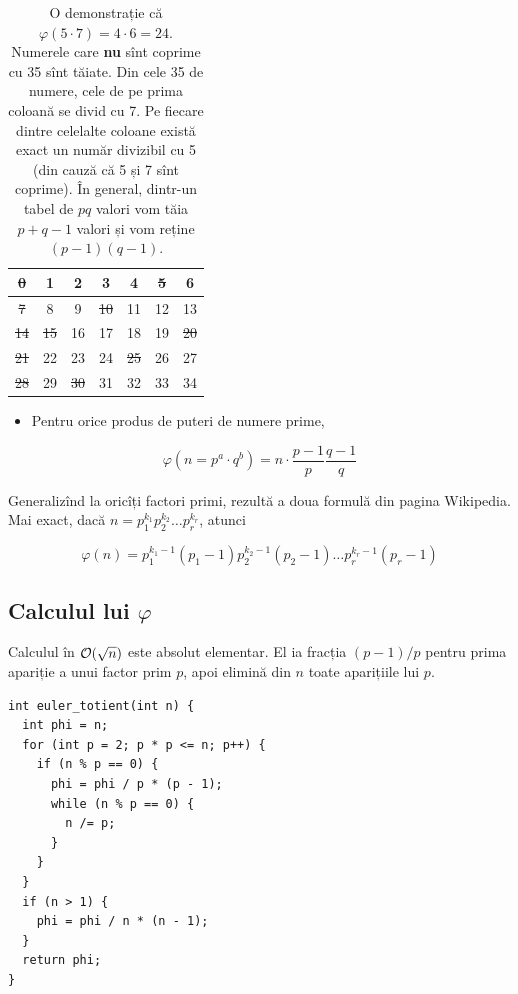 \documentclass[../main.tex]{subfiles}
\begin{document}
\begin{table}[!htbp]
  \centering
  \begin{tabular}{|c|c|c|c|c|c|c|}
    \hline
    \sout{0} & 1 & 2 & 3 & 4 & \sout{5} & 6 \\
    \hline
    \sout{7} & 8 & 9 & \sout{10} & 11 & 12 & 13 \\
    \hline
    \sout{14} & \sout{15} & 16 & 17 & 18 & 19 & \sout{20} \\
    \hline
    \sout{21} & 22 & 23 & 24 & \sout{25} & 26 & 27 \\
    \hline
    \sout{28} & 29 & \sout{30} & 31 & 32 & 33 & 34 \\
    \hline
  \end{tabular}

  \caption{O demonstrație că $\varphi(5 \cdot 7) = 4 \cdot 6 = 24$. Numerele care \textbf{nu} sînt coprime cu 35 sînt tăiate. Din cele 35 de numere, cele de pe prima coloană se divid cu 7. Pe fiecare dintre celelalte coloane există exact un număr divizibil cu 5 (din cauză că 5 și 7 sînt coprime). În general, dintr-un tabel de $pq$ valori vom tăia $p+q-1$ valori și vom reține $(p-1)(q-1)$. }
\end{table}

\begin{itemize}
  \item Pentru orice produs de puteri de numere prime,
\end{itemize}
$$\varphi(n = p^a \cdot q^b) = n \cdot \frac{p-1}{p} \frac{q-1}{q}$$

Generalizînd la oricîți factori primi, rezultă a doua formulă din pagina Wikipedia. Mai exact, dacă $n = p_1^{k_1}p_2^{k_2} \dots p_r^{k_r}$, atunci

$$\varphi(n) = p_1^{k_1-1}(p_1 - 1) p_2^{k_2-1} (p_2 - 1) \dots p_r^{k_r-1} (p_r - 1)$$

\subsection{Calculul lui \texorpdfstring{$\varphi$}{phi}}

Calculul în $\mathcal{O}(\sqrt{n})$ este absolut elementar. El ia fracția $(p-1)/p$ pentru prima apariție a unui factor prim $p$, apoi elimină din $n$ toate aparițiile lui $p$.

\begin{verbatim}
int euler_totient(int n) {
  int phi = n;
  for (int p = 2; p * p <= n; p++) {
    if (n % p == 0) {
      phi = phi / p * (p - 1);
      while (n % p == 0) {
        n /= p;
      }
    }
  }
  if (n > 1) {
    phi = phi / n * (n - 1);
  }
  return phi;
}
\end{verbatim}
\end{document}
